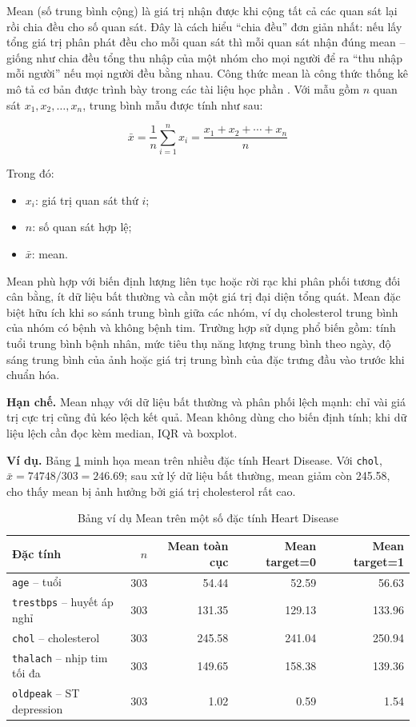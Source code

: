 Mean (số trung bình cộng) là giá trị nhận được khi cộng tất cả các quan sát lại rồi chia đều cho số quan sát. Đây là cách hiểu ``chia đều'' đơn giản nhất: nếu lấy tổng giá trị phân phát đều cho mỗi quan sát thì mỗi quan sát nhận đúng mean -- giống như chia đều tổng thu nhập của một nhóm cho mọi người để ra ``thu nhập mỗi người'' nếu mọi người đều bằng nhau. Công thức mean là công thức thống kê mô tả cơ bản được trình bày trong các tài liệu học phần \cite{Sahay2021Essentials,DeMauro2021DataAnalytics}. Với mẫu gồm $n$ quan sát $x_1, x_2, \ldots, x_n$, trung bình mẫu được tính như sau:

\begin{equation}
\bar{x} = \frac{1}{n}\sum_{i=1}^{n}x_i = \frac{x_1+x_2+\cdots+x_n}{n}
\end{equation}

Trong đó:
\begin{itemize}[leftmargin=1.6em,label=\textbullet]
 \item $x_i$: giá trị quan sát thứ $i$;
 \item $n$: số quan sát hợp lệ;
 \item $\bar{x}$: mean.
\end{itemize}

Mean phù hợp với biến định lượng liên tục hoặc rời rạc khi phân phối tương đối cân bằng, ít dữ liệu bất thường và cần một giá trị đại diện tổng quát. Mean đặc biệt hữu ích khi so sánh trung bình giữa các nhóm, ví dụ cholesterol trung bình của nhóm có bệnh và không bệnh tim. Trường hợp sử dụng phổ biến gồm: tính tuổi trung bình bệnh nhân, mức tiêu thụ năng lượng trung bình theo ngày, độ sáng trung bình của ảnh hoặc giá trị trung bình của đặc trưng đầu vào trước khi chuẩn hóa.

\textbf{Hạn chế.} Mean nhạy với dữ liệu bất thường và phân phối lệch mạnh: chỉ vài giá trị cực trị cũng đủ kéo lệch kết quả. Mean không dùng cho biến định tính; khi dữ liệu lệch cần đọc kèm median, IQR và boxplot.

\textbf{Ví dụ.} Bảng \ref{tab:chapter1_mean_example} minh họa mean trên nhiều đặc tính Heart Disease. Với \texttt{chol}, $\bar{x}=74748/303=246.69$; sau xử lý dữ liệu bất thường, mean giảm còn 245.58, cho thấy mean bị ảnh hưởng bởi giá trị cholesterol rất cao.

\begin{table}[H]
\centering
\caption{Bảng ví dụ Mean trên một số đặc tính Heart Disease}
\label{tab:chapter1_mean_example}
\small
\begin{tabular}{lrrrr}
\toprule
Đặc tính & $n$ & Mean toàn cục & Mean target=0 & Mean target=1 \\
\midrule
\texttt{age} -- tuổi & 303 & 54.44 & 52.59 & 56.63 \\
\texttt{trestbps} -- huyết áp nghỉ & 303 & 131.35 & 129.13 & 133.96 \\
\texttt{chol} -- cholesterol & 303 & 245.58 & 241.04 & 250.94 \\
\texttt{thalach} -- nhịp tim tối đa & 303 & 149.65 & 158.38 & 139.36 \\
\texttt{oldpeak} -- ST depression & 303 & 1.02 & 0.59 & 1.54 \\
\bottomrule
\end{tabular}
\end{table}

